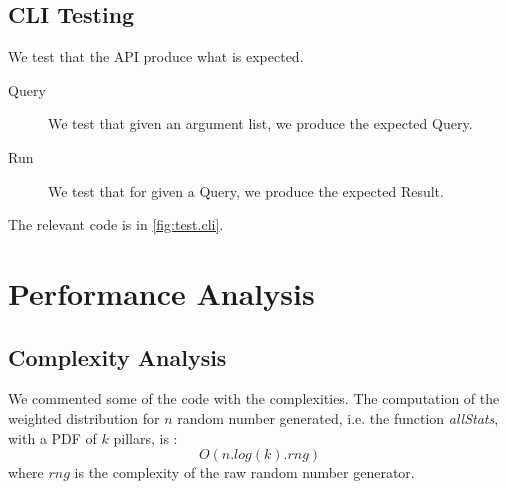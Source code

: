 \documentclass[12pt,a4paper,article]{memoir} %
\begin{document}
\subsection{CLI Testing}
We test that the API produce what is expected.
\begin{description}
	\item [Query]
	We test that given an argument list, we produce the expected
	Query.
	\item[Run]
	We test that for given a Query, we produce the expected Result.
\end{description}
The relevant code is in \autoref{fig:test.cli}.
\section{Performance Analysis}
\label{sec:perf}

\subsection{Complexity Analysis}
We commented some of the code with the complexities.
The computation of the weighted distribution for $n$ random number generated, 
i.e. the function \emph{allStats}, with a PDF of $k$ pillars, is :
\[
	O(n . log (k) . rng )
\]
where $rng$ is the complexity of the raw random number generator.
\end{document}
